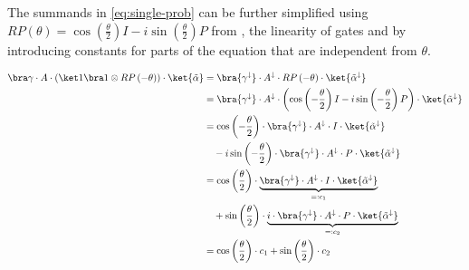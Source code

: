 The summands in \autoref{eq:single-prob} can be further simplified using
$RP\left(\theta\right) = \cos\left(\frac\theta2\right) I - i \sin\left(\frac\theta2\right) P$
from \cite{ostaszewski_structure_2021}, the linearity of gates and by
introducing constants for parts of the equation that are independent from
$\theta$.

\begin{equation}
    \label{eq:single-prob-simplification1}
    \begin{split}
        \bra\gamma \cdot A \cdot (\ket 1 \bra 1 \otimes RP\left(-\theta\right)) \cdot \ket{\tilde\alpha}
            &= \bra{\gamma^\downarrow} \cdot A^\downarrow \cdot RP\left(-\theta\right) \cdot \ket{\tilde\alpha^\downarrow} \\
            &= \bra{\gamma^\downarrow} \cdot A^\downarrow \cdot \left(\cos\left(-\frac\theta2\right) I - i \sin\left(-\frac\theta2\right) P\right) \cdot \ket{\tilde\alpha^\downarrow} \\
            &= \cos\left(-\frac\theta2\right) \cdot \bra{\gamma^\downarrow} \cdot A^\downarrow \cdot I \cdot \ket{\tilde\alpha^\downarrow} \\
                &\quad - i \sin\left(-\frac\theta2\right) \cdot \bra{\gamma^\downarrow} \cdot A^\downarrow \cdot P \cdot \ket{\tilde\alpha^\downarrow} \\
            &= \cos\left(\frac\theta2\right) \cdot \underbrace{\bra{\gamma^\downarrow} \cdot A^\downarrow \cdot I \cdot \ket{\tilde\alpha^\downarrow}}_{=: c_1} \\
                &\quad + \sin\left(\frac\theta2\right) \cdot \underbrace{i \cdot \bra{\gamma^\downarrow} \cdot A^\downarrow \cdot P \cdot \ket{\tilde\alpha^\downarrow}}_{=: c_2} \\
            &= \cos\left(\frac\theta2\right) \cdot c_1 + \sin\left(\frac\theta2\right) \cdot c_2
    \end{split}
\end{equation}


